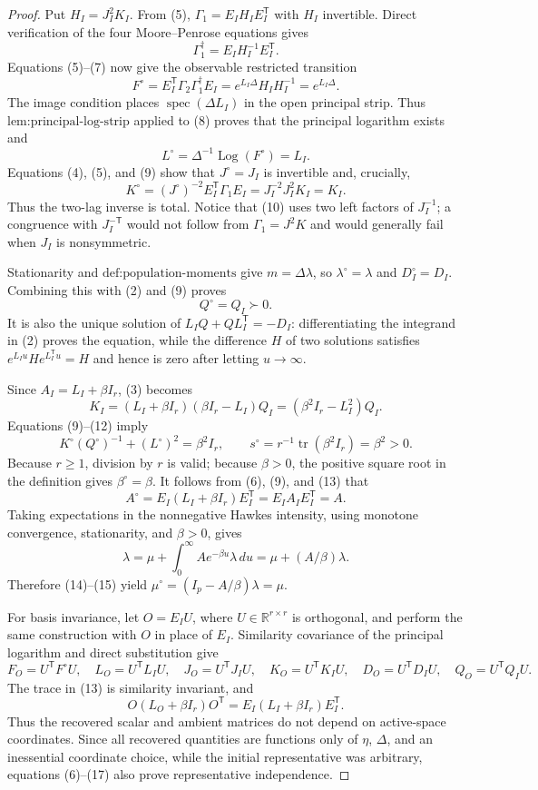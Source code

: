 \documentclass{article}
\begin{document}
\begin{proof}
Put \(H_I=J_I^2K_I\).  From (5), \(\Gamma_1=E_IH_IE_I^{\mathsf T}\) with \(H_I\) invertible.  Direct verification of the four Moore--Penrose equations gives
\[
 \Gamma_1^\dagger=E_IH_I^{-1}E_I^{\mathsf T}.
\tag{7}
\]
Equations (5)--(7) now give the observable restricted transition
\[
 F^\circ=E_I^{\mathsf T}\Gamma_2\Gamma_1^\dagger E_I
 =e^{L_I\Delta}H_IH_I^{-1}=e^{L_I\Delta}.
\tag{8}
\]
The image condition places \(\operatorname{spec}(\Delta L_I)\) in the open principal strip.  Thus \(\text{lem:principal-log-strip}\) applied to (8) proves that the principal logarithm exists and
\[
 L^\circ=\Delta^{-1}\operatorname{Log}(F^\circ)=L_I.
\tag{9}
\]
Equations (4), (5), and (9) show that \(J^\circ=J_I\) is invertible and, crucially,
\[
 K^\circ=(J^\circ)^{-2}E_I^{\mathsf T}\Gamma_1E_I
 =J_I^{-2}J_I^2K_I=K_I.
\tag{10}
\]
Thus the two-lag inverse is total.  Notice that (10) uses two left factors of \(J_I^{-1}\); a congruence with \(J_I^{-\mathsf T}\) would not follow from \(\Gamma_1=J^2K\) and would generally fail when \(J_I\) is nonsymmetric.

Stationarity and \(\text{def:population-moments}\) give \(m=\Delta\lambda\), so \(\lambda^\circ=\lambda\) and \(D_I^\circ=D_I\).  Combining this with (2) and (9) proves
\[
 Q^\circ=Q_I\succ0.
\tag{11}
\]
It is also the unique solution of \(L_IQ+QL_I^{\mathsf T}=-D_I\): differentiating the integrand in (2) proves the equation, while the difference \(H\) of two solutions satisfies \(e^{L_Iu}He^{L_I^{\mathsf T}u}=H\) and hence is zero after letting \(u\to\infty\).

Since \(A_I=L_I+\beta I_r\), (3) becomes
\[
 K_I=(L_I+\beta I_r)(\beta I_r-L_I)Q_I
     =(\beta^2I_r-L_I^2)Q_I.
\tag{12}
\]
Equations (9)--(12) imply
\[
 K^\circ(Q^\circ)^{-1}+(L^\circ)^2=\beta^2I_r,\qquad
 s^\circ=r^{-1}\operatorname{tr}(\beta^2I_r)=\beta^2>0.
\tag{13}
\]
Because \(r\geq1\), division by \(r\) is valid; because \(\beta>0\), the positive square root in the definition gives \(\beta^\circ=\beta\).  It follows from (6), (9), and (13) that
\[
 A^\circ=E_I(L_I+\beta I_r)E_I^{\mathsf T}=E_IA_IE_I^{\mathsf T}=A.
\tag{14}
\]
Taking expectations in the nonnegative Hawkes intensity, using monotone convergence, stationarity, and \(\beta>0\), gives
\[
 \lambda=\mu+\int_0^\infty Ae^{-\beta u}\lambda\,du
 =\mu+(A/\beta)\lambda.
\tag{15}
\]
Therefore (14)--(15) yield \(\mu^\circ=(I_p-A/\beta)\lambda=\mu\).

For basis invariance, let \(O=E_IU\), where \(U\in\mathbb R^{r\times r}\) is orthogonal, and perform the same construction with \(O\) in place of \(E_I\).  Similarity covariance of the principal logarithm and direct substitution give
\[
 F_O=U^{\mathsf T}F^\circ U,\quad L_O=U^{\mathsf T}L_IU,\quad
 J_O=U^{\mathsf T}J_IU,\quad K_O=U^{\mathsf T}K_IU,\quad
 D_O=U^{\mathsf T}D_IU,\quad Q_O=U^{\mathsf T}Q_IU.
\tag{16}
\]
The trace in (13) is similarity invariant, and
\[
 O(L_O+\beta I_r)O^{\mathsf T}=E_I(L_I+\beta I_r)E_I^{\mathsf T}.
\tag{17}
\]
Thus the recovered scalar and ambient matrices do not depend on active-space coordinates.  Since all recovered quantities are functions only of \(\eta\), \(\Delta\), and an inessential coordinate choice, while the initial representative was arbitrary, equations (6)--(17) also prove representative independence.


\end{proof}
\end{document}
